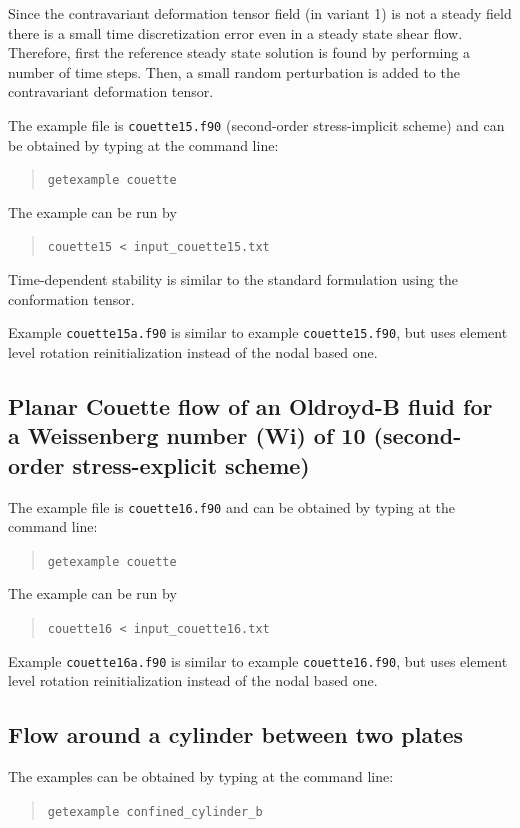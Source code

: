 Since the contravariant deformation tensor field (in variant 1)
 is not a steady field there is a small time discretization error 
even in a steady state shear flow. Therefore, first the reference steady state solution is found by performing a number of time steps. Then, a small random perturbation is added to the contravariant deformation tensor. 

The example file is \texttt{couette15.f90} (second-order stress-implicit
scheme) and can be obtained by typing at the
command line:
\medskip
\begin{quote}
   \texttt{getexample couette}
\end{quote}
%
The example can be run by
\begin{quote}
   \texttt{couette15 < input\_couette15.txt}
\end{quote}
%
Time-dependent stability is similar to the standard formulation using the conformation tensor.

Example \texttt{couette15a.f90} is similar to example \texttt{couette15.f90}, but uses element level rotation reinitialization instead of the nodal based one.

\subsection{Planar Couette flow of an Oldroyd-B fluid for a
 Weissenberg number (Wi) of 10 (second-order stress-explicit scheme)}
\label{sec:couette_b_OldB}

The example file is \texttt{couette16.f90} and can be obtained by typing at the
command line:
\begin{quote}
   \texttt{getexample couette}
\end{quote}
%
The example can be run by
\begin{quote}
   \texttt{couette16 < input\_couette16.txt}
\end{quote}

Example \texttt{couette16a.f90} is similar to example \texttt{couette16.f90}, but uses element level rotation reinitialization instead of the nodal based one.

\subsection{Flow around a cylinder between two plates}
\label{sec:confcyl1}
The examples can be obtained by typing at the command line:
\begin{quote}
   \texttt{getexample confined\_cylinder\_b}
\end{quote}


